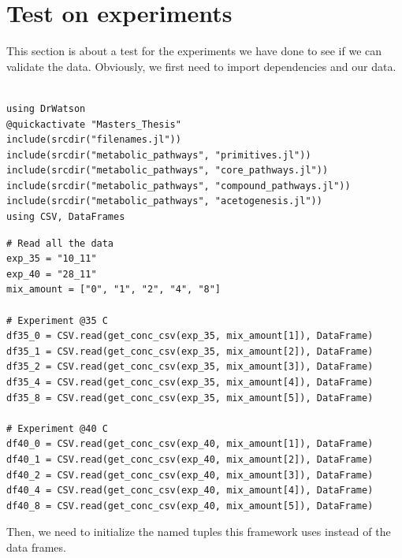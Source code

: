 \documentclass[11pt]{article}
\begin{document}
\section{Test on experiments}
\label{sec:orgc7dfd25}
This section is about a test for the experiments we have done to see if we can validate the data. Obviously, we first need to import dependencies and our data.

\begin{verbatim}

using DrWatson
@quickactivate "Masters_Thesis"
include(srcdir("filenames.jl"))
include(srcdir("metabolic_pathways", "primitives.jl"))
include(srcdir("metabolic_pathways", "core_pathways.jl"))
include(srcdir("metabolic_pathways", "compound_pathways.jl"))
include(srcdir("metabolic_pathways", "acetogenesis.jl"))
using CSV, DataFrames

\end{verbatim}

\begin{verbatim}
# Read all the data
exp_35 = "10_11"
exp_40 = "28_11"
mix_amount = ["0", "1", "2", "4", "8"]

# Experiment @35 C
df35_0 = CSV.read(get_conc_csv(exp_35, mix_amount[1]), DataFrame)
df35_1 = CSV.read(get_conc_csv(exp_35, mix_amount[2]), DataFrame)
df35_2 = CSV.read(get_conc_csv(exp_35, mix_amount[3]), DataFrame)
df35_4 = CSV.read(get_conc_csv(exp_35, mix_amount[4]), DataFrame)
df35_8 = CSV.read(get_conc_csv(exp_35, mix_amount[5]), DataFrame)

# Experiment @40 C
df40_0 = CSV.read(get_conc_csv(exp_40, mix_amount[1]), DataFrame)
df40_1 = CSV.read(get_conc_csv(exp_40, mix_amount[2]), DataFrame)
df40_2 = CSV.read(get_conc_csv(exp_40, mix_amount[3]), DataFrame)
df40_4 = CSV.read(get_conc_csv(exp_40, mix_amount[4]), DataFrame)
df40_8 = CSV.read(get_conc_csv(exp_40, mix_amount[5]), DataFrame)

\end{verbatim}

Then, we need to initialize the named tuples this framework uses instead of the data frames.
\end{document}
